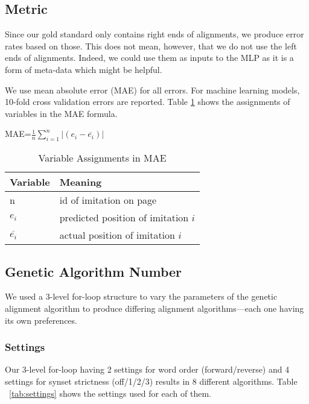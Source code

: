 \subsection{Metric}
Since our gold standard only contains right ends of alignments, we produce error rates based on those. This does not mean, however, that we do not use the left ends of alignments. Indeed, we could use them as inputs to the MLP as it is a form of meta-data which might be helpful.

We use mean absolute error (MAE) for all errors. For machine learning models, 10-fold cross validation errors are reported. Table \ref{tab:variable_assignments} shows the assignments of variables in the MAE formula.

\begin{center}
	MAE=$\frac{1}{n}\sum_{i=1}^{n}{|(e_i-\overline{e_i})|}$
\end{center}

\begin{table}[center]
	\centering
	\begin{tabular} {| l | l |}
		\hline	\textbf{Variable} 	&	\textbf{Meaning} \\
		\hline	n					&	id of imitation on page				\\
		\hline	$e_i$				&	predicted position of imitation $i$	\\
		\hline	$\overline{e_i}$	&	actual position of imitation $i$	\\ \hline
	\end{tabular}
	\caption{Variable Assignments in MAE}
	\label{tab:variable_assignments}
\end{table}


\subsection{Genetic Algorithm Number}%
We used a 3-level for-loop structure to vary the parameters of the genetic alignment algorithm to produce differing alignment algorithms---each one having its own preferences. 

\subsubsection{Settings}
Our 3-level for-loop having 2 settings for word order (forward/reverse) and 4 settings for synset strictness (off/1/2/3) results in 8 different algorithms. Table ~\ref{tab:settings} shows the settings used for each of them.%

